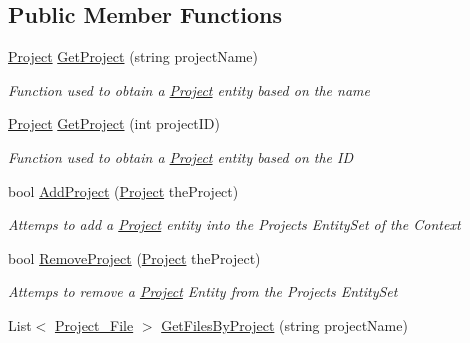 \subsection*{Public Member Functions}
\begin{DoxyCompactItemize}
\item 
\hyperlink{class_k_change_logger_1_1_project}{Project} \hyperlink{class_k_change_logger_1_1_k_change_data_context_data_context_aed65866a299fc4380877651af1091ed1}{Get\-Project} (string project\-Name)
\begin{DoxyCompactList}\small\item\em Function used to obtain a \hyperlink{class_k_change_logger_1_1_project}{Project} entity based on the name \end{DoxyCompactList}\item 
\hyperlink{class_k_change_logger_1_1_project}{Project} \hyperlink{class_k_change_logger_1_1_k_change_data_context_data_context_a322011ddc346eb333fa87a49d5dc250b}{Get\-Project} (int project\-I\-D)
\begin{DoxyCompactList}\small\item\em Function used to obtain a \hyperlink{class_k_change_logger_1_1_project}{Project} entity based on the I\-D \end{DoxyCompactList}\item 
bool \hyperlink{class_k_change_logger_1_1_k_change_data_context_data_context_ac22d62bcf0766fea09b0b39d10332bd6}{Add\-Project} (\hyperlink{class_k_change_logger_1_1_project}{Project} the\-Project)
\begin{DoxyCompactList}\small\item\em Attemps to add a \hyperlink{class_k_change_logger_1_1_project}{Project} entity into the Projects Entity\-Set of the Context \end{DoxyCompactList}\item 
bool \hyperlink{class_k_change_logger_1_1_k_change_data_context_data_context_a6c42cb8a091ae63b3e7d25bcef13068d}{Remove\-Project} (\hyperlink{class_k_change_logger_1_1_project}{Project} the\-Project)
\begin{DoxyCompactList}\small\item\em Attemps to remove a \hyperlink{class_k_change_logger_1_1_project}{Project} Entity from the Projects Entity\-Set \end{DoxyCompactList}\item 
List$<$ \hyperlink{class_k_change_logger_1_1_project___file}{Project\-\_\-\-File} $>$ \hyperlink{class_k_change_logger_1_1_k_change_data_context_data_context_aa2e018c33b7c1a648d8ae8e85e4bc6f4}{Get\-Files\-By\-Project} (string project\-Name)

\end{DoxyCompactItemize}

